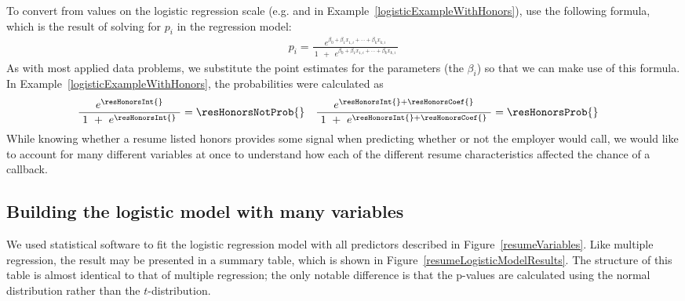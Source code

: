 To convert from values on the logistic regression scale
(e.g. \resHonorsInt{} and \resHonorsIntPlusCoef{} in
Example~\ref{logisticExampleWithHonors}),
use the following formula, which is the result
of solving for $p_i$ in the regression model:
\newcommand{\exponentialToSolveForPi}
    {e^{\beta_0 + \beta_1 x_{1,i}+\cdots+\beta_k x_{k,i}}}%
\begin{align*}
p_i = \frac{\exponentialToSolveForPi{}}
    {\ 1\ \ +\ \ \exponentialToSolveForPi{}\ }
\end{align*}
As with most applied data problems,
we substitute the point estimates for the parameters
(the $\beta_i$) so that we can make use of this formula.
In Example~\ref{logisticExampleWithHonors},
the probabilities were calculated as
\begin{align*}
&\frac{\ e^{\resHonorsInt{}}\ }
    {\ 1\ +\ e^{\resHonorsInt{}}\ }
  = \resHonorsNotProb{} &&
\frac{\ e^{\resHonorsInt{} + \resHonorsCoef{}}\ }
    {\ 1\ +\ e^{\resHonorsInt{} + \resHonorsCoef{}}\ }
  = \resHonorsProb{}
\end{align*}
While knowing whether a resume listed honors provides
some signal when predicting whether or not the employer
would call, we would like to account for many different
variables at once to understand how each of the different
resume characteristics affected the chance of a callback.


\subsection{Building the logistic model with many variables}

We used statistical software to fit the logistic regression
model with all \resNumPred{} predictors described in
Figure~\ref{resumeVariables}.
Like multiple regression, the result may be presented
in a summary table, which is shown in
Figure~\ref{resumeLogisticModelResults}.
The structure of this table is almost identical to that
of multiple regression;
the only notable difference is that the p-values are
calculated using the normal distribution rather than
the $t$-distribution.

